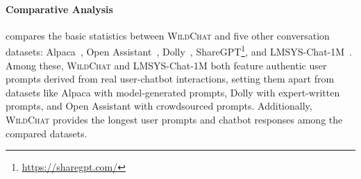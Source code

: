 \documentclass{article} %
\newcommand{\corpus}{\textsc{WildChat}\xspace}
\begin{document}
\paragraph{Comparative Analysis}
 compares the basic statistics between \corpus and five other conversation datasets: Alpaca~\citep{alpaca}, Open Assistant~\citep{openassistant}, Dolly~\citep{dolly}, ShareGPT\footnote{\url{https://sharegpt.com/}}, and LMSYS-Chat-1M~\citep{zheng2024realchatm}. Among these, \corpus and LMSYS-Chat-1M both feature authentic user prompts derived from real user-chatbot interactions, setting them apart from datasets like Alpaca with model-generated prompts, Dolly with expert-written prompts, and Open Assistant with crowdsourced prompts. Additionally, \corpus provides the longest user prompts and chatbot responses among the compared datasets.
\end{document}
